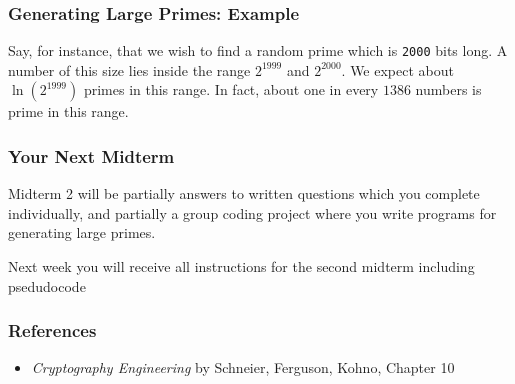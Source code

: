 \documentclass{beamer}
\newcommand{\<}{\langle}
\renewcommand{\>}{\rangle}
\begin{document}
\begin{frame}[fragile]
\frametitle{Generating Large Primes: Example}

Say, for instance, that we wish to find a random prime which is \verb|2000| bits long. A number of this size lies inside the range $2^{1999}$ and $2^{2000}$. We expect about $\ln(2^{1999})$ primes in this range. In fact, about one in every $1386$ numbers is prime in this range. 
\end{frame}


\begin{frame}
\frametitle{Your Next Midterm}

Midterm 2 will be partially answers to written questions which you complete individually, and partially a group coding project where you write programs for generating large primes.\newline

Next week you will receive all instructions for the second midterm including psedudocode 
\end{frame}




\begin{frame}
\frametitle{References}

\begin{itemize}
\item \emph{Cryptography Engineering} by Schneier, Ferguson, Kohno, Chapter 10
\end{itemize}
\end{frame}
\end{document}
